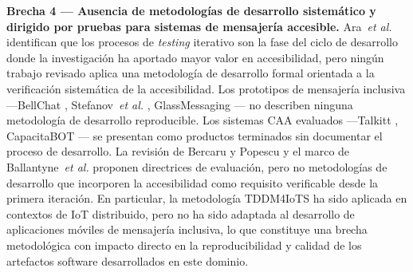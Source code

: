 \documentclass[journal]{IEEEtran}
\begin{document}
			\textbf{Brecha 4 --- Ausencia de metodolog\'ias de desarrollo sistem\'atico y dirigido por pruebas para sistemas de mensajer\'ia accesible.} Ara~\textit{et al.} \cite{ara2024} identifican que los procesos de \textit{testing} iterativo son la fase del ciclo de desarrollo donde la investigaci\'on ha aportado mayor valor en accesibilidad, pero ning\'un trabajo revisado aplica una metodolog\'ia de desarrollo formal orientada a la verificaci\'on sistem\'atica de la accesibilidad. Los prototipos de mensajer\'ia inclusiva ---BellChat \cite{guerrero2021bellchat}, Stefanov~\textit{et al.} \cite{stefanov2024}, GlassMessaging \cite{janaka2023}--- no describen ninguna metodolog\'ia de desarrollo reproducible. Los sistemas CAA evaluados ---Talkitt \cite{costanzo2023}, CapacitaBOT \cite{mateos2022}--- se presentan como productos terminados sin documentar el proceso de desarrollo. La revisi\'on de Bercaru y Popescu \cite{bercaru2024} y el marco de Ballantyne~\textit{et al.} \cite{ballantyne2018} proponen directrices de evaluaci\'on, pero no metodolog\'ias de desarrollo que incorporen la accesibilidad como requisito verificable desde la primera iteraci\'on. En particular, la metodolog\'ia TDDM4IoTS \cite{guerrero2020} ha sido aplicada en contextos de IoT distribuido, pero no ha sido adaptada al desarrollo de aplicaciones m\'oviles de mensajer\'ia inclusiva, lo que constituye una brecha metodol\'ogica con impacto directo en la reproducibilidad y calidad de los artefactos software desarrollados en este dominio.
			
\end{document}
